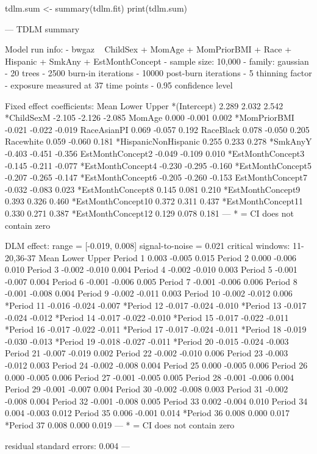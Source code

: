 \begin{example}
tdlm.sum <- summary(tdlm.fit)
print(tdlm.sum)
\end{example}

\begin{example}
---
TDLM summary

Model run info:
- bwgaz ~ ChildSex + MomAge + MomPriorBMI + Race + Hispanic + SmkAny + EstMonthConcept
- sample size: 10,000
- family: gaussian
- 20 trees
- 2500 burn-in iterations
- 10000 post-burn iterations
- 5 thinning factor
- exposure measured at 37 time points
- 0.95 confidence level

Fixed effect coefficients:
                       Mean  Lower  Upper
*(Intercept)          2.289  2.032  2.542
*ChildSexM           -2.105 -2.126 -2.085
MomAge                0.000 -0.001  0.002
*MomPriorBMI         -0.021 -0.022 -0.019
RaceAsianPI           0.069 -0.057  0.192
RaceBlack             0.078 -0.050  0.205
Racewhite             0.059 -0.060  0.181
*HispanicNonHispanic  0.255  0.233  0.278
*SmkAnyY             -0.403 -0.451 -0.356
EstMonthConcept2     -0.049 -0.109  0.010
*EstMonthConcept3    -0.145 -0.211 -0.077
*EstMonthConcept4    -0.230 -0.295 -0.160
*EstMonthConcept5    -0.207 -0.265 -0.147
*EstMonthConcept6    -0.205 -0.260 -0.153
EstMonthConcept7     -0.032 -0.083  0.023
*EstMonthConcept8     0.145  0.081  0.210
*EstMonthConcept9     0.393  0.326  0.460
*EstMonthConcept10    0.372  0.311  0.437
*EstMonthConcept11    0.330  0.271  0.387
*EstMonthConcept12    0.129  0.078  0.181
---
* = CI does not contain zero

DLM effect:
range = [-0.019, 0.008]
signal-to-noise = 0.021
critical windows: 11-20,36-37
             Mean  Lower  Upper
Period 1    0.003 -0.005  0.015
Period 2    0.000 -0.006  0.010
Period 3   -0.002 -0.010  0.004
Period 4   -0.002 -0.010  0.003
Period 5   -0.001 -0.007  0.004
Period 6   -0.001 -0.006  0.005
Period 7   -0.001 -0.006  0.006
Period 8   -0.001 -0.008  0.004
Period 9   -0.002 -0.011  0.003
Period 10  -0.002 -0.012  0.006
*Period 11 -0.016 -0.024 -0.007
*Period 12 -0.017 -0.024 -0.010
*Period 13 -0.017 -0.024 -0.012
*Period 14 -0.017 -0.022 -0.010
*Period 15 -0.017 -0.022 -0.011
*Period 16 -0.017 -0.022 -0.011
*Period 17 -0.017 -0.024 -0.011
*Period 18 -0.019 -0.030 -0.013
*Period 19 -0.018 -0.027 -0.011
*Period 20 -0.015 -0.024 -0.003
Period 21  -0.007 -0.019  0.002
Period 22  -0.002 -0.010  0.006
Period 23  -0.003 -0.012  0.003
Period 24  -0.002 -0.008  0.004
Period 25   0.000 -0.005  0.006
Period 26   0.000 -0.005  0.006
Period 27  -0.001 -0.005  0.005
Period 28  -0.001 -0.006  0.004
Period 29  -0.001 -0.007  0.004
Period 30  -0.002 -0.008  0.003
Period 31  -0.002 -0.008  0.004
Period 32  -0.001 -0.008  0.005
Period 33   0.002 -0.004  0.010
Period 34   0.004 -0.003  0.012
Period 35   0.006 -0.001  0.014
*Period 36  0.008  0.000  0.017
*Period 37  0.008  0.000  0.019
---
* = CI does not contain zero

residual standard errors: 0.004
---
\end{example}

